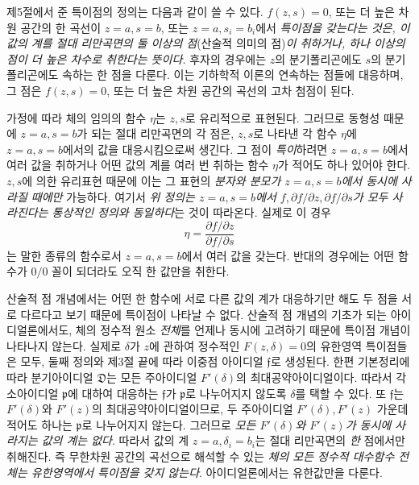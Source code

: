 제5절에서 준 특이점의 정의는 다음과 같이 쓸 수 있다. \(f(z,s)=0\), 또는 더 높은 차원 공간의 한 곡선이 \(z=a,s=b\), 또는 \(z=a,s_i=b_i\)에서 \emph{특이점을 갖는다는 것은, 이 값의 계를 절대 리만곡면의 둘 이상의 점}(산술적 의미의 점)\emph{이 취하거나, 하나 이상의 점이 더 높은 차수로 취한다는 뜻이다.} 후자의 경우에는 \(z\)의 분기폴리곤에도 \(s\)의 분기폴리곤에도 속하는 한 점을 다룬다. 이는 기하학적 이론의 \glqq{}연속하는 점들\grqq{}에 대응하며, 그 점은 \(f(z,s)=0\), 또는 더 높은 차원 공간의 곡선의 고차 첨점이 된다.

가정에 따라 체의 임의의 함수 \(\eta\)는 \(z,s\)로 유리적으로 표현된다. 그러므로 동형성 때문에 \(z=a,s=b\)가 되는 절대 리만곡면의 각 점은, \(z,s\)로 나타낸 각 함수 \(\eta\)에 \(z=a,s=b\)에서의 값을 대응시킴으로써 생긴다. 그 점이 \emph{특이}하려면 \(z=a,s=b\)에서 여러 값을 취하거나 어떤 값의 계를 여러 번 취하는 함수 \(\eta\)가 적어도 하나 있어야 한다. \(z,s\)에 의한 유리표현 때문에 이는 그 표현의 \emph{분자와 분모가 \(z=a,s=b\)에서 동시에 사라질 때에만} 가능하다. 여기서 \emph{위 정의는 \(z=a,s=b\)에서 \(f,\partial f/\partial z,\partial f/\partial s\)가 모두 사라진다는 통상적인 정의와 동일하다}는 것이 따라온다. 실제로 이 경우
\[
\eta=\frac{\partial f/\partial z}{\partial f/\partial s}
\]
는 말한 종류의 함수로서 \(z=a,s=b\)에서 여러 값을 갖는다. 반대의 경우에는 어떤 함수가 \(0/0\) 꼴이 되더라도 오직 한 값만을 취한다.

산술적 점 개념에서는 어떤 한 함수에 서로 다른 값의 계가 대응하기만 해도 두 점을 서로 다르다고 보기 때문에 특이점이 나타날 수 없다. 산술적 점 개념의 기초가 되는 아이디얼론에서도, 체의 정수적 원소 \emph{전체}를 언제나 동시에 고려하기 때문에 특이점 개념이 나타나지 않는다. 실제로 \(\delta\)가 \(z\)에 관하여 정수적인 \(F(z,\delta)=0\)의 유한영역 특이점들은 모두, 둘째 정의와 제3절 끝에 따라 \glqq{}이중점 아이디얼\grqq{} \(\mathfrak f\)로 생성된다. 한편 기본정리에 따라 분기아이디얼 \(\mathfrak D\)는 모든 주아이디얼 \(F'(\delta)\)의 최대공약아이디얼이다. 따라서 각 소아이디얼 \(\mathfrak p\)에 대하여 대응하는 \(\mathfrak f\)가 \(\mathfrak p\)로 나누어지지 않도록 \(\delta\)를 택할 수 있다. 또 \(\mathfrak f\)는 \(F'(\delta)\)와 \(F'(z)\)의 최대공약아이디얼이므로, 두 주아이디얼 \(F'(\delta),F'(z)\) 가운데 적어도 하나는 \(\mathfrak p\)로 나누어지지 않는다. 그러므로 \emph{모든 \(F'(\delta)\)와 \(F'(z)\)가 동시에 사라지는 값의 계는 없다}. 따라서 값의 계 \(z=a,\delta_i=b_i\)는 절대 리만곡면의 \emph{한} 점에서만 취해진다. 즉 무한차원 공간의 곡선으로 해석할 수 있는 \emph{체의 모든 정수적 대수함수 전체는 유한영역에서 특이점을 갖지 않는다}. 아이디얼론에서는 유한값만을 다룬다.

